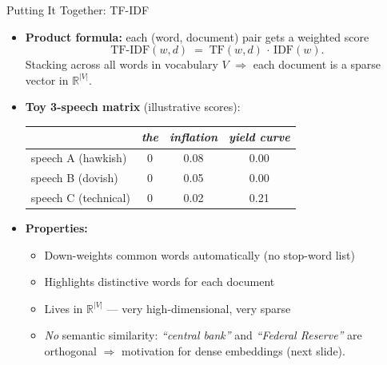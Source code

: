 \documentclass[10pt,english,aspectratio=169]{beamer}
\begin{document}
\begin{frame}{Putting It Together: TF-IDF}
\begin{itemize}
\item \textbf{Product formula:} each (word, document) pair gets a weighted score
\[
   \text{TF-IDF}(w, d) \;=\; \text{TF}(w, d)\,\cdot\,\text{IDF}(w).
\]
Stacking across all words in vocabulary $V$ $\Rightarrow$ each document is a sparse vector in $\mathbb{R}^{|V|}$.

\medskip
\item \textbf{Toy 3-speech matrix} (illustrative scores):
\begin{center}
\begin{tabular}{l c c c}
\toprule
 & \emph{the} & \emph{inflation} & \emph{yield curve} \\
\midrule
speech A (hawkish)   & 0 & 0.08 & 0.00 \\
speech B (dovish)    & 0 & 0.05 & 0.00 \\
speech C (technical) & 0 & 0.02 & 0.21 \\
\bottomrule
\end{tabular}
\end{center}

\medskip
\item \textbf{Properties:}
\begin{itemize}
    \item Down-weights common words automatically (no stop-word list)
    \item Highlights distinctive words for each document
    \item Lives in $\mathbb{R}^{|V|}$ --- very high-dimensional, very sparse
    \item \emph{No} semantic similarity: \emph{``central bank''} and \emph{``Federal Reserve''} are orthogonal $\Rightarrow$ motivation for dense embeddings (next slide).
\end{itemize}
\end{itemize}
\end{frame}
\end{document}
